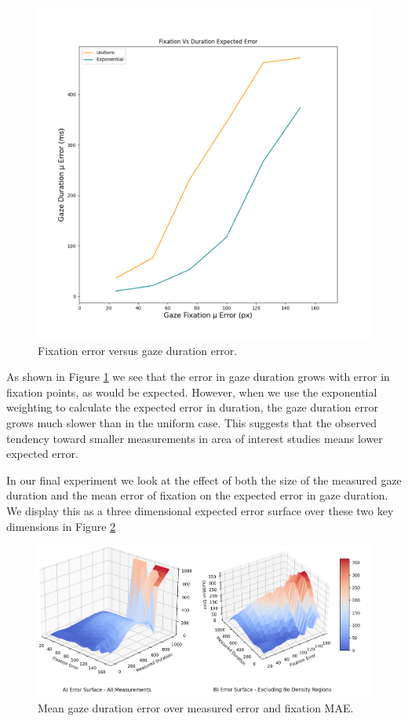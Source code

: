 \documentclass[12pt,a4paper]{article}
\numberwithin{equation}{section}
\begin{document}
\begin{figure}[h!]
\includegraphics[scale=0.5]{../results/Fixation_vs_duration_error.png}
\caption{Fixation error versus gaze duration error.}
\label{fig:fixation_vs_duration}
\end{figure}

As shown in Figure \ref{fig:fixation_vs_duration} we see that the error in gaze duration
grows with error in fixation points, as would be expected. However, when we use the exponential
weighting to calculate the expected error in duration, the gaze duration error grows much slower
than in the uniform case. This suggests that the observed tendency toward smaller measurements
in area of interest studies means lower expected error.

In our final experiment we look at the effect of both the size of the measured 
gaze duration and the mean error of fixation on the expected error in gaze duration.
We display this as a three dimensional expected error surface over these two key dimensions
in Figure \ref{fig:error_surface}

\begin{figure}[h!]
\includegraphics[scale=0.5]{../results/Error_surface.png}
\caption{Mean gaze duration error over measured error and fixation MAE.}
\label{fig:error_surface}
\end{figure}
\end{document}
